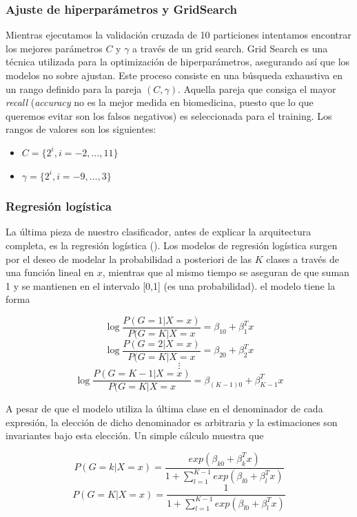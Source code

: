 \subsubsection{Ajuste de hiperparámetros y GridSearch}

Mientras ejecutamos la validación cruzada de 10 particiones intentamos encontrar los mejores parámetros $C$ y $\gamma$ a través de un grid search. Grid Search es una técnica utilizada para la optimización de hiperparámetros, asegurando así que los modelos no sobre ajustan. Este proceso consiste en una búsqueda exhaustiva en un rango definido para la pareja $(C,\gamma)$. Aquella pareja que consiga el mayor \textit{recall} (\textit{accuracy} no es la mejor medida en biomedicina, puesto que lo que queremos evitar son los falsos negativos) es seleccionada para el training. Los rangos de valores son los siguientes:
\begin{itemize}
	\item $C = \{2^{i},i=-2,\dots,11\} $
	\item $\gamma = \{2^{i}, i =-9,\dots,3\}$
\end{itemize}

\subsubsection{Regresión logística}

La última pieza de nuestro clasificador, antes de explicar la arquitectura completa, es la regresión logística (\cite{esl}). Los modelos de regresión logística surgen por el deseo de modelar la probabilidad a posteriori de las $K$ clases a través de una función lineal en $x$, mientras que al mismo tiempo se aseguran de que suman 1 y se mantienen en el intervalo [0,1] (es una probabilidad). el modelo tiene la forma

$$\log \frac{P(G=1| X =x)}{P(G=K|X=x} =  \beta_{10} + \beta_1^Tx$$
 $$\log \frac{P(G=2| X =x)}{P(G=K|X=x} =  \beta_{20} + \beta_2^Tx$$
 $$\vdots$$
 $$\log \frac{P(G=K-1| X =x)}{P(G=K|X=x} =  \beta_{(K-1)0} + \beta_{K-1}^Tx$$
 
 A pesar de que el modelo utiliza la última clase en el denominador de cada expresión, la elección de dicho denominador es arbitraria y la estimaciones son invariantes bajo esta elección. Un simple cálculo muestra que
 
 $$P(G=k| X=x) = \frac{exp(\beta_{k0}+\beta_k^T x)}{1+\sum_{l=1}^{K-1}exp(\beta_{l0}+\beta_l^Tx)}$$
  $$P(G=K| X=x) = \frac{1}{1+\sum_{l=1}^{K-1}exp(\beta_{l0}+\beta_l^Tx)}$$
  
